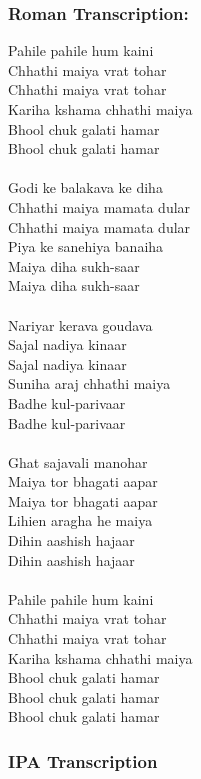 \documentclass[17pt]{extarticle}
\begin{document}
\subsubsection*{\textbf{Roman Transcription:}}
Pahile pahile hum kaini\\
Chhathi maiya vrat tohar\\
Chhathi maiya vrat tohar\\
Kariha kshama chhathi maiya\\
Bhool chuk galati hamar\\
Bhool chuk galati hamar\\\\
Godi ke balakava ke diha\\
Chhathi maiya mamata dular\\
Chhathi maiya mamata dular\\
Piya ke sanehiya banaiha\\
Maiya diha sukh-saar\\
Maiya diha sukh-saar\\\\
Nariyar kerava goudava\\
Sajal nadiya kinaar\\
Sajal nadiya kinaar\\
Suniha araj chhathi maiya\\
Badhe kul-parivaar\\
Badhe kul-parivaar\\\\
Ghat sajavali manohar\\
Maiya tor bhagati aapar\\
Maiya tor bhagati aapar\\
Lihien aragha he maiya\\
Dihin aashish hajaar\\
Dihin aashish hajaar\\\\
Pahile pahile hum kaini\\
Chhathi maiya vrat tohar\\
Chhathi maiya vrat tohar\\
Kariha kshama chhathi maiya\\
Bhool chuk galati hamar\\
Bhool chuk galati hamar\\
Bhool chuk galati hamar\\

\subsubsection*{\textbf{IPA Transcription}}
\end{document}

